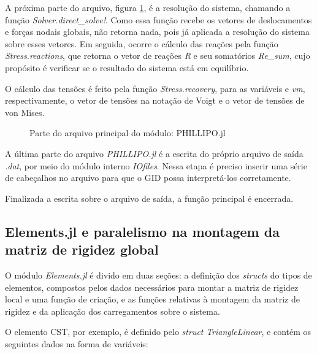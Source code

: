 A próxima parte do arquivo, figura \ref{fig:phillipo.jl_6}, é a resolução do sistema, chamando a função \emph{Solver.direct\_solve!}. Como essa função recebe os vetores de deslocamentos e forças nodais globais, não retorna nada, pois já aplicada a resolução do sistema sobre esses vetores. Em seguida, ocorre o cálculo das reações pela função \emph{Stress.reactions}, que retorna o vetor de reações \emph{R} e seu somatórios \emph{Re\_sum}, cujo propósito é verificar se o resultado do sistema está em equilíbrio.

O cálculo das tensões é feito pela função \emph{Stress.recovery}, para as variáveis \emph{\sigma} e \emph{\sigma vm}, respectivamente, o vetor de tensões na notação de Voigt e o vetor de tensões de von Mises.

\begin{figure}[hbtp]
    \caption{Parte do arquivo principal do módulo: PHILLIPO.jl}
    
    \label{fig:phillipo.jl_6}
\end{figure}

A última parte do arquivo \emph{PHILLIPO.jl} é a escrita do próprio arquivo de saída \emph{.dat}, por meio do módulo interno \emph{IOfiles}. Nessa etapa é preciso inserir uma série de cabeçalhos no arquivo para que o GID possa interpretá-los corretamente. 

Finalizada a escrita sobre o arquivo de saída, a função principal é encerrada.

\subsection{Elements.jl e paralelismo na montagem da matriz de rigidez global}

O módulo \emph{Elements.jl} é divido em duas seções: a definição dos \emph{structs} do tipos de elementos, compostos pelos dados necessários para montar a matriz de rigidez local e uma função de criação, e as funções relativas à montagem da matriz de rigidez e da aplicação dos carregamentos sobre o sistema.


O elemento CST, por exemplo, é definido pelo \emph{struct} \emph{TriangleLinear}, e contém os seguintes dados na forma de variáveis:

